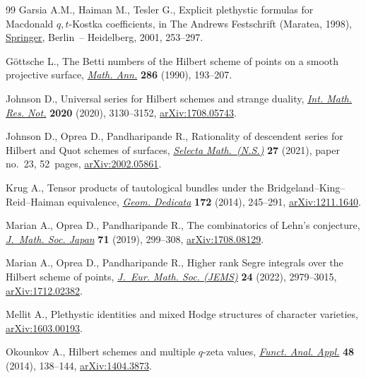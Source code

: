 \begin{thebibliography}{99}
Garsia A.M., Haiman M., Tesler G., Explicit plethystic formulas for {M}acdonald
 {$q,t$}-{K}ostka coefficients, in The Andrews Festschrift (Maratea, 1998),
 \href{https://doi.org/10.1007/978-3-642-56513-7_13}{Springer}, Berlin~-- Heidelberg, 2001, 253--297.

G\"ottsche L., The {B}etti numbers of the {H}ilbert scheme of points on a
 smooth projective surface, \href{https://doi.org/10.1007/BF01453572}{\textit{Math. Ann.}} \textbf{286} (1990), 193--207.

Johnson D., Universal series for {H}ilbert schemes and strange duality,
 \href{https://doi.org/10.1093/imrn/rny101}{\textit{Int. Math. Res. Not.}} \textbf{2020} (2020), 3130--3152,
 \href{https://arxiv.org/abs/1708.05743}{arXiv:1708.05743}.

Johnson D., Oprea D., Pandharipande R., Rationality of descendent series for
 {H}ilbert and {Q}uot schemes of surfaces, \href{https://doi.org/10.1007/s00029-021-00638-1}{\textit{Selecta Math.~(N.S.)}}
 \textbf{27} (2021), paper no.~23, 52~pages, \href{https://arxiv.org/abs/2002.05861}{arXiv:2002.05861}.

Krug A., Tensor products of tautological bundles under the
 {B}ridgeland--{K}ing--{R}eid--{H}aiman equivalence, \href{https://doi.org/10.1007/s10711-013-9919-1}{\textit{Geom. Dedicata}}
 \textbf{172} (2014), 245--291, \href{https://arxiv.org/abs/1211.1640}{arXiv:1211.1640}.

Marian A., Oprea D., Pandharipande R., The combinatorics of {L}ehn's
 conjecture, \href{https://doi.org/10.2969/jmsj/78747874}{\textit{J.~Math. Soc. Japan}} \textbf{71} (2019), 299--308,
 \href{https://arxiv.org/abs/1708.08129}{arXiv:1708.08129}.

Marian A., Oprea D., Pandharipande R., Higher rank {S}egre integrals over the
 {H}ilbert scheme of points, \href{https://doi.org/10.4171/jems/1149}{\textit{J.~Eur. Math. Soc. (JEMS)}} \textbf{24}
 (2022), 2979--3015, \href{https://arxiv.org/abs/1712.02382}{arXiv:1712.02382}.

Mellit A., Plethystic identities and mixed {H}odge structures of character
 varieties, \href{https://arxiv.org/abs/1603.00193}{arXiv:1603.00193}.

Okounkov A., Hilbert schemes and multiple {$q$}-zeta values, \href{https://doi.org/10.1007/s10688-014-0054-z}{\textit{Funct.
 Anal. Appl.}} \textbf{48} (2014), 138--144, \href{https://arxiv.org/abs/1404.3873}{arXiv:1404.3873}.


\end{thebibliography}
